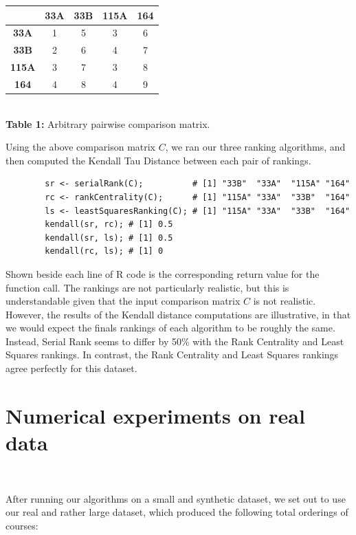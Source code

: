 \documentclass[10pt]{siamltex}
\begin{document}
\begin{pagewiselinenumbers}
\begin{center}
\begin{table}
\end{table}
\begin{tabular}{ c | c | c | c | c}
& \textbf{33A} & \textbf{33B} & \textbf{115A} & \textbf{164}\\\hline
\textbf{33A}    & 1 & 5  & 3 & 6\\
\textbf{33B}    & 2 & 6  & 4 & 7\\
\textbf{115A} &  3 & 7 & 3 & 8\\
\textbf{164}    &  4 & 8 & 4 & 9\\
\end{tabular}
\\\textbf{Table 1:} Arbitrary pairwise comparison matrix. 
\end{center}

Using the above comparison matrix $C$, we ran our three ranking algorithms, and then computed the Kendall Tau Distance between each pair of rankings.\\

\begin{verbatim}
        sr <- serialRank(C);          # [1] "33B"  "33A"  "115A" "164" 
        rc <- rankCentrality(C);      # [1] "115A" "33A"  "33B"  "164" 
        ls <- leastSquaresRanking(C); # [1] "115A" "33A"  "33B"  "164"
        kendall(sr, rc); # [1] 0.5
        kendall(sr, ls); # [1] 0.5
        kendall(rc, ls); # [1] 0
\end{verbatim}

Shown beside each line of R code is the corresponding return value for the function call. The rankings are not particularly realistic, but this is understandable given that the input comparison matrix $C$ is not realistic. However, the results of the Kendall distance computations are illustrative, in that we would expect the finals rankings of each algorithm to be roughly the same.  Instead, Serial Rank seems to differ by 50\% with the Rank Centrality and Least Squares rankings. In contrast, the Rank Centrality and Least Squares rankings agree perfectly for this dataset.

\section{Numerical experiments on real data}   \label{sec:NumExpReal}\textcolor{white}{.}

After running our algorithms on a small and synthetic dataset, we set out to use our real and rather large dataset, which produced the following total orderings of courses:


\end{pagewiselinenumbers}
\end{document}
